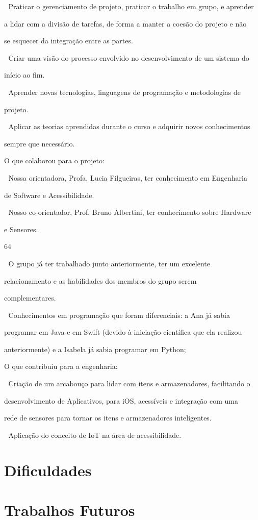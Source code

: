 Praticar o gerenciamento de projeto, praticar o trabalho em grupo, e aprender

a lidar com a divisão de tarefas, de forma a manter a coesão do projeto e não

se esquecer da integração entre as partes.

 Criar uma visão do processo envolvido no desenvolvimento de um sistema do

início ao fim.

 Aprender novas tecnologias, linguagens de programação e metodologias de

projeto.

 Aplicar as teorias aprendidas durante o curso e adquirir novos conhecimentos

sempre que necessário.

O que colaborou para o projeto:

 Nossa orientadora, Profa. Lucia Filgueiras, ter conhecimento em Engenharia

de Software e Acessibilidade.

 Nosso co-orientador, Prof. Bruno Albertini, ter conhecimento sobre Hardware

e Sensores.

64

 O grupo já ter trabalhado junto anteriormente, ter um excelente

relacionamento e as habilidades dos membros do grupo serem

complementares.

 Conhecimentos em programação que foram diferenciais: a Ana já sabia

programar em Java e em Swift (devido à iniciação científica que ela realizou

anteriormente) e a Isabela já sabia programar em Python;

O que contribuiu para a engenharia:

 Criação de um arcabouço para lidar com itens e armazenadores, facilitando o

desenvolvimento de Aplicativos, para iOS, acessíveis e integração com uma

rede de sensores para tornar os itens e armazenadores inteligentes.

 Aplicação do conceito de IoT na área de acessibilidade.

\section{Dificuldades}\label{sec-conc-dificuldades}

\section{Trabalhos Futuros}\label{sec-conc-trabalhos-futuros}
